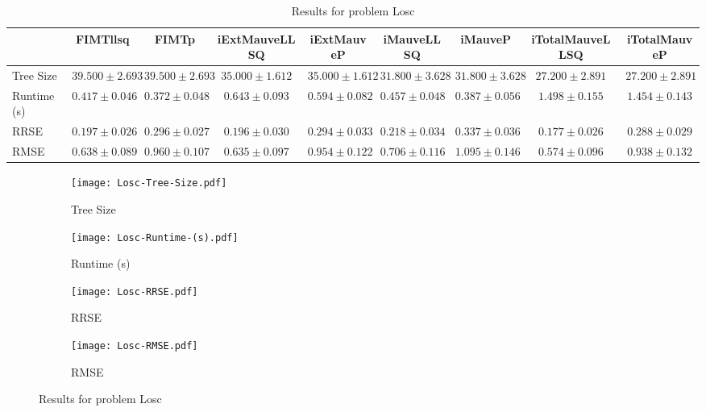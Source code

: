 \documentclass{article}
\begin{document}
\begin{table}[h]
\tiny
\begin{tabular}{|l|c|c|c|c|c|c|c|c|}
\hline
 & FIMTllsq & FIMTp & iExtMauveLLSQ & iExtMauveP & iMauveLLSQ & iMauveP & iTotalMauveLLSQ & iTotalMauveP\\
\hline
Tree Size & $39.500 \pm 2.693$ & $39.500 \pm 2.693$ & $35.000 \pm 1.612$ & $35.000 \pm 1.612$ & $31.800 \pm 3.628$ & $31.800 \pm 3.628$ & \cellcolor{blue!25} $27.200 \pm 2.891$ & \cellcolor{blue!25} $27.200 \pm 2.891$ \\
\hline
Runtime (s) & $0.417 \pm 0.046$ & \cellcolor{blue!25} $0.372 \pm 0.048$ & $0.643 \pm 0.093$ & $0.594 \pm 0.082$ & $0.457 \pm 0.048$ & $0.387 \pm 0.056$ & $1.498 \pm 0.155$ & $1.454 \pm 0.143$ \\
\hline
RRSE & $0.197 \pm 0.026$ & $0.296 \pm 0.027$ & $0.196 \pm 0.030$ & $0.294 \pm 0.033$ & $0.218 \pm 0.034$ & $0.337 \pm 0.036$ & \cellcolor{blue!25} $0.177 \pm 0.026$ & $0.288 \pm 0.029$ \\
\hline
RMSE & $0.638 \pm 0.089$ & $0.960 \pm 0.107$ & $0.635 \pm 0.097$ & $0.954 \pm 0.122$ & $0.706 \pm 0.116$ & $1.095 \pm 0.146$ & \cellcolor{blue!25} $0.574 \pm 0.096$ & $0.938 \pm 0.132$ \\
\hline
\end{tabular}
\caption{Results for problem Losc}
\end{table}
\begin{figure}[h]
\centering
\begin{subfigure}{0.45\textwidth}
  \texttt{[image: Losc-Tree-Size.pdf]}
  \caption{Tree Size}
\end{subfigure}
\begin{subfigure}{0.45\textwidth}
  \texttt{[image: Losc-Runtime-(s).pdf]}
  \caption{Runtime (s)}
\end{subfigure}
\begin{subfigure}{0.45\textwidth}
  \texttt{[image: Losc-RRSE.pdf]}
  \caption{RRSE}
\end{subfigure}
\begin{subfigure}{0.45\textwidth}
  \texttt{[image: Losc-RMSE.pdf]}
  \caption{RMSE}
\end{subfigure}
\caption{Results for problem Losc}
\end{figure}
\end{document}

